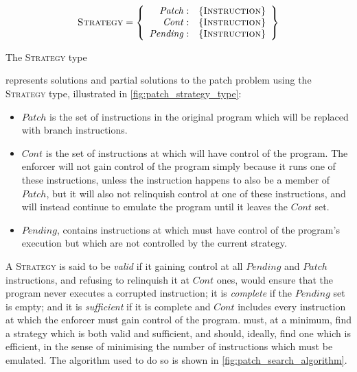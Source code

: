 \begin{sanefig}
  \begin{displaymath}
    \textsc{Strategy} = \left\{\begin{array}{rl}
    \mathit{Patch}: & \{\textsc{Instruction}\} \\
    \mathit{Cont}: & \{\textsc{Instruction}\} \\
    \mathit{Pending}: & \{\textsc{Instruction}\}
    \end{array}\right\}
  \end{displaymath}
  \vspace{-12pt}
  \caption{The \textsc{Strategy} type}
  \label{fig:patch_strategy_type}
\end{sanefig}

{\Implementation} represents solutions and partial solutions to the
patch problem using the \textsc{Strategy} type, illustrated in
\autoref{fig:patch_strategy_type}:
\begin{itemize}
\item $\mathit{Patch}$ is the set of instructions in the original
  program which will be replaced with branch instructions.
\item $\mathit{Cont}$ is the set of instructions at which
  {\implementation} will have control of the program.  The enforcer
  will not gain control of the program simply because it runs one of
  these instructions, unless the instruction happens to also be a
  member of $\mathit{Patch}$, but it will also not relinquish control
  at one of these instructions, and will instead continue to emulate
  the program until it leaves the $\mathit{Cont}$ set.
\item $\mathit{Pending}$, contains instructions at which
  {\implementation} must have control of the program's execution but
  which are not controlled by the current strategy.
\end{itemize}
A \textsc{Strategy} is said to be \emph{valid} if it gaining
control at all $\mathit{Pending}$ and $\mathit{Patch}$ instructions,
and refusing to relinquish it at $\mathit{Cont}$ ones, would ensure
that the program never executes a corrupted instruction; it is
\emph{complete} if the $\mathit{Pending}$ set is empty; and it is
\emph{sufficient} if it is complete and $\mathit{Cont}$ includes every
instruction at which the enforcer must gain control of the program.
{\Implementation} must, at a minimum, find a strategy which is both
valid and sufficient, and should, ideally, find one which is
efficient, in the sense of minimising the number of instructions which
must be emulated.  The algorithm used to do so is shown in
\autoref{fig:patch_search_algorithm}.

